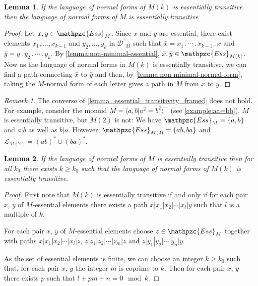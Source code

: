 \documentclass[a4paper,final]{article}
\let\ge\geqslant
\theoremstyle{plain}
\newtheorem{lemma}[lemma]{Lemma}
\theoremstyle{remark}
\newtheorem*{remark}{Remark}
\theoremstyle{definition}
\begin{document}
\begin{lemma}\label{lemma_essential_transitivity_framed}
  If the language of normal forms of $M(k)$ is essentially transitive
  then the language of normal forms of $M$ is essentially transitive
\end{lemma}
\begin{proof}
  Let $x,y \in {\mathpzc{Ess}}_M$.  Since $x$ and $y$ are essential, there exist elements $x_1,\ldots,x_{k-1}$ and 
  $y_2,\ldots,y_k$ in ${{\mathcal{D}}^{\!{}^{\circ}\!}}_M$ such that $\bar x = x_1 {\mathbin{.}} \cdots{\mathbin{.}} x_{k-1} {\mathbin{.}} x$ and
  $\bar y = y {\mathbin{.}} y_2{\mathbin{.}}  \cdots{\mathbin{.}} y_k$.  
  By \autoref{lemma:non-minimal-essential}, $\bar x, \bar y \in {\mathpzc{Ess}}_{M(k)}$.
  Now as the language of normal forms in $M(k)$ is
  essentially transitive, we can find a path connecting $\bar x$ to
  $\bar y$ and then, by \autoref{lemma:non-minimal-normal-form},
  taking the $M$-normal form of each letter gives a path in $M$ from
  $x$ to $y$.
\end{proof}

\begin{remark}
The converse of \autoref{lemma_essential_transitivity_framed} does not hold.  For example, consider the monoid $M=\langle a, b {\boldsymbol{\mid}} a^2=b^2\rangle^+$ (see \autoref{example:aa=bb}).
$M$ is essentially transitive, but $M(2)$ is not:  We have ${\mathpzc{Ess}}_M = \{a,b\}$ and $a|b$ as well as $b|a$.  However, ${\mathpzc{Ess}}_{M(2)} = \{ab,ba\}$ and ${\mathcal{L}}_{M(2)} = (ab)^* \cup (ba)^*$.
\end{remark}

\begin{lemma}
  If the language of normal forms of $M$ is essentially transitive then
  for all $k_0$ there exists $k \ge k_0$ such that the language of
  normal forms of $M(k)$ is essentially transitive.
\end{lemma}
\begin{proof}
  First note that $M(k)$ is essentially transitive if and only if for
  each pair $x$, $y$ of $M$-essential elements there exists a
  path $x|x_1|x_2|\cdots|x_l|y$ such that $l$ is a multiple of $k$.

  For each pair $x$, $y$ of $M$-essential elements choose
  $z\in{\mathpzc{Ess}}_M$ together with paths $x|x_1|x_2|\cdots|x_l|z$,
  $z|z_1|z_2|\cdots|z_m|z$ and $z|y_1|y_2|\cdots|y_n|y$.

  As the set of essential elements is finite, we can choose an integer $k\ge k_0$ such that, for each pair $x$, $y$ the integer $m$ is coprime to $k$.
  Then for each pair $x$, $y$ there exists $p$ such that $l + pm + n = 0 \mod{k}$.
\end{proof}
\end{document}
